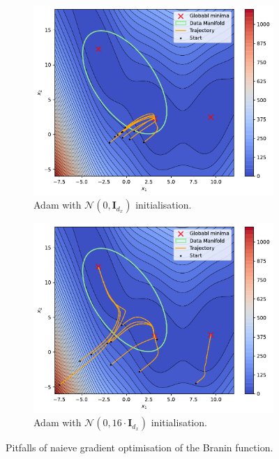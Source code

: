 \begin{figure}[t]
    \centering
    \begin{subfigure}[b]{0.48\textwidth}
        \centering
        \includegraphics[width=1\textwidth]{assets/adam_branin.pdf}
        \caption{Adam with $\mathcal{N}(0, \mathbf{I}_{d_x})$ initialisation.}
        \label{fig:branin-adam-a}
    \end{subfigure}
    \hfill
    \begin{subfigure}[b]{0.48\textwidth}
        \centering
        \includegraphics[width=1\textwidth]{assets/adam_larger_branin.pdf}
        \caption{Adam with $\mathcal{N}(0, 16\cdot\mathbf{I}_{d_x})$ initialisation.}
        \label{fig:branin-adam-b}
    \end{subfigure}
    \caption{Pitfalls of naieve gradient optimisation of the Branin function.}
    \label{fig:branin-adam}
\end{figure}

